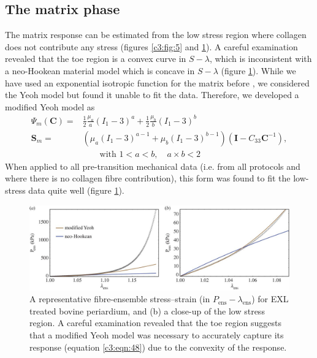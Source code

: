         
\subsection{The matrix phase}

    The matrix response can be estimated from the low stress region where collagen does not contribute any stress (figures \ref{c3:fig:5} and \ref{c3:fig:6}). A careful examination revealed that the toe region is a convex curve in $S-\lambda$, which is inconsistent with a neo-Hookean material model which is concave in $S-\lambda$ (figure \ref{c3:fig:6}). While we have used an exponential isotropic function for the matrix before \cite{sacks_structural_2000}, we considered the Yeoh model but found it unable to fit the data. Therefore, we developed a modified Yeoh model as
        \begin{equation}\label{c3:eqn:48}
        \begin{aligned}
        \Psi_m(\mathbf{C}) =& \frac{1}{2}\frac{\mu_a}{a}(I_1 - 3)^a + \frac{1}{2}\frac{\mu_b}{b}(I_1 - 3)^b  \\
        \mathbf{S}_m =& \left(\mu_a(I_1 - 3)^{a-1} + \mu_b(I_1 - 3)^{b-1}\right)(\mathbf{I} - C_{33}\mathbf{C}^{-1}), \\
        &\quad\quad \text{with } 1<a<b, \quad a\times b < 2
        \end{aligned}
        \end{equation}
    When applied to all pre-transition mechanical data (i.e. from all protocols and where there is no collagen fibre contribution), this form was found to fit the low-stress data quite well (figure \ref{c3:fig:6}).
    

\begin{figure}
\centering
\includegraphics[width=\textwidth]{Images/chapter3/F6large.jpg}
\caption{A representative fibre-ensemble stress–strain (in $P_\mathrm{ens}-\lambda_\mathrm{ens}$)  for EXL treated bovine periardium, and (b) a close-up of the low stress region. A careful examination revealed that the toe region suggests that a modified Yeoh model was necessary to accurately capture its response (equation \ref{c3:eqn:48}) due to the convexity of the response.}
\label{c3:fig:6}
\end{figure}
    
